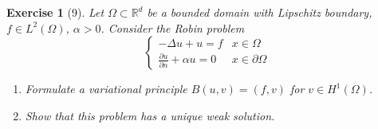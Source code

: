 \documentclass[letterpaper,twoside,11pt]{article}
\theoremstyle{mystyle}
\newtheorem*{exercise}{Exercise}
\newcommand{\R}{{\mathbb R}}
\begin{document}
\begin{exercise}[9]
Let $\Omega\subset \R^d$ be a bounded domain with Lipschitz boundary, $f \in L^2 \left( \Omega \right)$, $\alpha > 0$. Consider the Robin problem
\[\left\{ {\begin{array}{*{20}{c}}
  { -\Delta u + u = f}&{x\in \Omega} \\[.2cm] 
  {\displaystyle \frac{\partial u}{\partial n }+ \alpha u = 0}&{x \in \partial \Omega} 
\end{array}} \right.\]
\begin{enumerate}
  \item Formulate a variational principle $B(u,v) = (f, v)$ for $v \in H^1 \left( \Omega \right)$. 
  \item Show that this problem has a unique weak solution. 
\end{enumerate}
\end{exercise}
\end{document}
